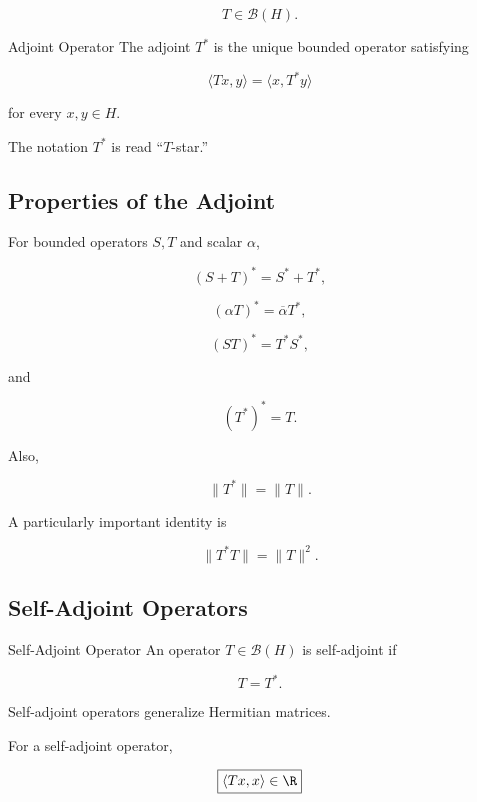\[
T\in\mathcal{B}(H).
\]

\begin{definitionbox}{Adjoint Operator}
The adjoint \(T^*\) is the unique bounded operator satisfying

\[
\boxed{
\langle Tx,y\rangle
=
\langle x,T^*y\rangle
}
\]

for every \(x,y\in H\).
\end{definitionbox}

The notation \(T^*\) is read ``\(T\)-star.''

\subsection{Properties of the Adjoint}
\label{subsec:adjoint-properties}

For bounded operators \(S,T\) and scalar \(\alpha\),

\[
\boxed{
(S+T)^*
=
S^*+T^*,
}
\]

\[
\boxed{
(\alpha T)^*
=
\overline{\alpha}T^*,
}
\]

\[
\boxed{
(ST)^*
=
T^*S^*,
}
\]

and

\[
\boxed{
(T^*)^*=T.
}
\]

Also,

\[
\boxed{
\|T^*\|=\|T\|.
}
\]

A particularly important identity is

\[
\boxed{
\|T^*T\|
=
\|T\|^2.
}
\]

\subsection{Self-Adjoint Operators}
\label{subsec:self-adjoint-operators}

\begin{definitionbox}{Self-Adjoint Operator}
An operator \(T\in\mathcal{B}(H)\) is self-adjoint if

\[
\boxed{
T=T^*.
}
\]
\end{definitionbox}

Self-adjoint operators generalize Hermitian matrices.

For a self-adjoint operator,

\[
\boxed{
\langle Tx,x\rangle\in\R
}
\]

